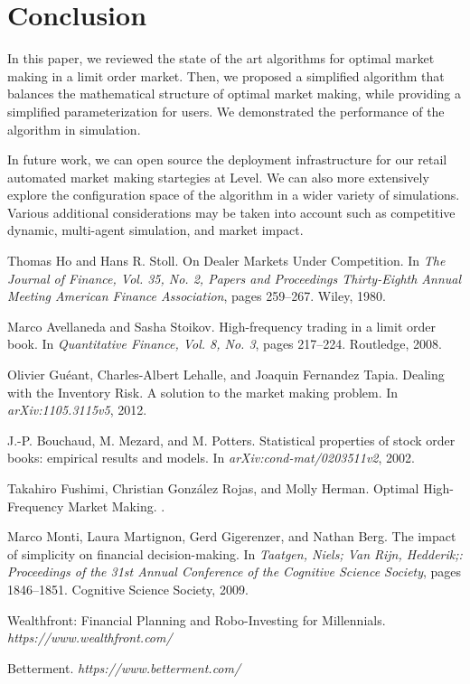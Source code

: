 \documentclass{article}
\begin{document}
\section{Conclusion}
\label{sec:conclusion}

In this paper, we reviewed the state of the art algorithms for optimal market making in a limit order market. Then, we proposed a simplified algorithm that balances the mathematical structure of optimal market making, while providing a simplified parameterization for users. We demonstrated the performance of the algorithm in simulation.

In future work, we can open source the deployment infrastructure for our retail automated market making startegies at Level. We can also more extensively explore the configuration space of the algorithm in a wider variety of simulations. Various additional considerations may be taken into account such as competitive dynamic, multi-agent simulation, and market impact.

  

\begin{thebibliography}{1}

Thomas Ho and Hans R. Stoll.
\newblock On Dealer Markets Under Competition.
\newblock In {\em The Journal of Finance, Vol. 35, No. 2, Papers and Proceedings Thirty-Eighth Annual Meeting American Finance Association}, pages 259--267. Wiley, 1980.

Marco Avellaneda and Sasha Stoikov.
\newblock High-frequency trading in a limit order book.
\newblock In {\em Quantitative Finance, Vol. 8, No. 3}, pages 217--224. Routledge, 2008.

Olivier Guéant, Charles-Albert Lehalle, and Joaquin Fernandez Tapia.
\newblock Dealing with the Inventory Risk. A solution to the market making problem.
\newblock In {\em 	arXiv:1105.3115v5}, 2012.

J.-P. Bouchaud, M. Mezard, and M. Potters.
\newblock Statistical properties of stock order books: empirical results and models.
\newblock In {\em arXiv:cond-mat/0203511v2}, 2002.

Takahiro Fushimi, Christian González Rojas, and Molly Herman.
\newblock Optimal High-Frequency Market Making.
.

Marco Monti, Laura Martignon, Gerd Gigerenzer, and Nathan Berg.
\newblock The impact of simplicity on financial decision-making.
\newblock In {\em Taatgen, Niels; Van Rijn, Hedderik;: Proceedings of the 31st Annual Conference of the Cognitive Science Society}, pages 1846--1851. Cognitive Science Society, 2009.

Wealthfront: Financial Planning and Robo-Investing for Millennials.
\newblock \emph{https://www.wealthfront.com/}

Betterment.
\newblock \emph{https://www.betterment.com/}

\end{thebibliography}
\end{document}
